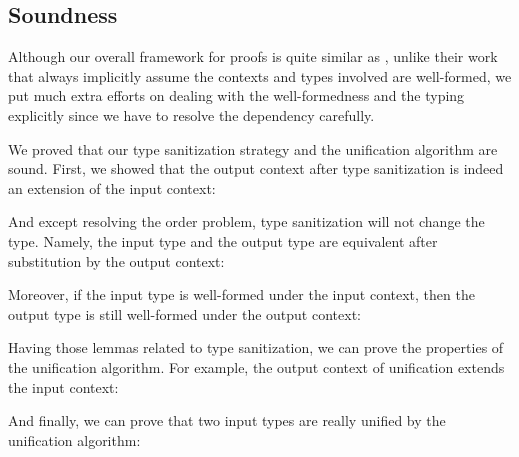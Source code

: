 \subsection{Soundness}

Although our overall framework for proofs is quite similar as
\citet{dunfield2013complete}, unlike their work that always implicitly assume
the contexts and types involved are well-formed, we put much extra efforts on
dealing with the well-formedness and the typing explicitly since we have to resolve the dependency carefully.

We proved that our type sanitization strategy and the unification algorithm
are sound.
First, we showed that the output context after type
sanitization is indeed an extension of the input context:

\begin{lemma}[\TypeSanitizationExtensionName]
  \TypeSanitizationExtensionBody
\end{lemma}

And except resolving the order problem, type sanitization will not change the
type. Namely, the input type and the output type are equivalent after
substitution by the output context:

\begin{lemma}[\TypeSanitizationEquivalenceName]
  \TypeSanitizationEquivalenceBody
\end{lemma}

Moreover, if the input type is well-formed under the input context, then the
output type is still well-formed under the output context:

\begin{lemma}[\TypeSanitizationWellFormednessName]
  \TypeSanitizationWellFormednessBody
\end{lemma}

Having those lemmas related to type sanitization, we can prove the properties of
the unification algorithm. For example, the output context of unification
extends the input context:

\begin{lemma}[\UnificationExtensionName]\leavevmode
  \UnificationExtensionBody
\end{lemma}

And finally, we can prove that two input types are really unified by the
unification algorithm:

\begin{lemma}[\UnificationEquivalenceName]\leavevmode
  \UnificationEquivalenceBody
\end{lemma}

